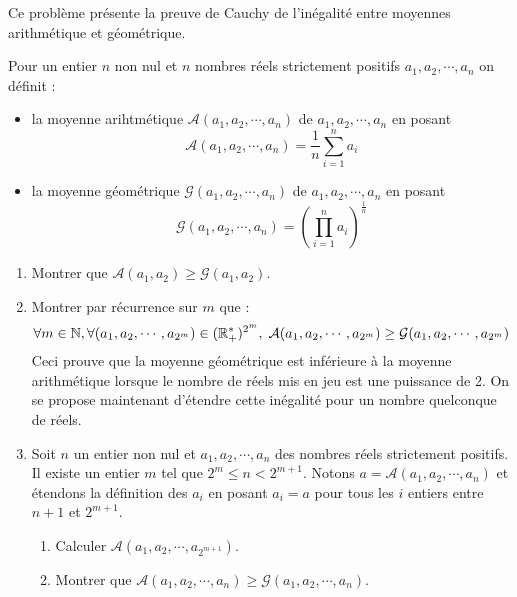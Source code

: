 Ce problème présente la preuve de Cauchy de l'inégalité entre moyennes arithmétique et géométrique.

Pour un entier $n$ non nul et $n$ nombres réels strictement positifs $a_{1},a_{2},\cdots ,a_{n}$ on définit :
\begin{itemize}
\item  la moyenne arihtmétique $\mathcal{A}(a_{1},a_{2},\cdots ,a_{n})$ de $a_{1},a_{2},\cdots ,a_{n}$ en posant
\begin{displaymath}
\mathcal{A}(a_{1},a_{2},\cdots ,a_{n})=\frac{1}{n}\sum_{i=1}^{n}a_{i} 
\end{displaymath}

\item  la moyenne géométrique $\mathcal{G}(a_{1},a_{2},\cdots,a_{n}) $ de $a_{1},a_{2},\cdots ,a_{n}$ en posant
\begin{displaymath}
 \mathcal{G}(a_{1},a_{2},\cdots ,a_{n})=\left( \prod_{i=1}^{n}a_{i}\right) ^{\frac{1}{n}}
\end{displaymath}
\end{itemize}

\begin{enumerate}
\item  Montrer que $\mathcal{A}(a_{1},a_{2})\geq \mathcal{G}(a_{1},a_{2})$.

\item  Montrer par récurrence sur $m$ que :
\begin{displaymath}
\forall m\in \mathbb{N} , \forall (a_{1},a_{2},\cdots ,a_{2^{m}})\in (\mathbb{R}_{+}^{*})^{2^{m}}, \;
\mathcal{A}(a_{1},a_{2},\cdots,a_{2^{m}})\geq \mathcal{G}(a_{1},a_{2},\cdots ,a_{2^{m}})
\end{displaymath}
Ceci prouve que la moyenne géométrique est inférieure à la moyenne arithmétique lorsque le nombre de réels mis en jeu est une puissance de 2. On se propose maintenant d'étendre cette inégalité pour un nombre quelconque de réels.

\item  Soit $n$ un entier non nul et $a_{1},a_{2},\cdots ,a_{n}$ des nombres réels strictement positifs. Il existe un entier $m$ tel que $2^{m}\leq n<2^{m+1}$. Notons $a=\mathcal{A}(a_{1},a_{2},\cdots ,a_{n})$ et étendons la définition des $a_{i}$ en posant $a_{i}=a$ pour tous les $i$ entiers entre $n+1$ et $2^{m+1}$.

\begin{enumerate}
\item  Calculer $\mathcal{A}(a_{1},a_{2},\cdots ,a_{2^{m+1}})$.

\item  Montrer que $\mathcal{A}(a_{1},a_{2},\cdots ,a_{n})\geq \mathcal{G}%
(a_{1},a_{2},\cdots ,a_{n})$.
\end{enumerate}

\end{enumerate}